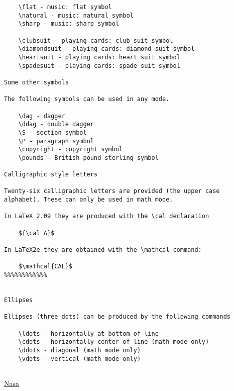 \documentclass{article}
\begin{document}
\begin{verbatim}
    \flat - music: flat symbol
    \natural - music: natural symbol
    \sharp - music: sharp symbol

    \clubsuit - playing cards: club suit symbol
    \diamondsuit - playing cards: diamond suit symbol
    \heartsuit - playing cards: heart suit symbol
    \spadesuit - playing cards: spade suit symbol

Some other symbols

The following symbols can be used in any mode.

    \dag - dagger
    \ddag - double dagger
    \S - section symbol
    \P - paragraph symbol
    \copyright - copyright symbol
    \pounds - British pound sterling symbol

Calligraphic style letters

Twenty-six calligraphic letters are provided (the upper case alphabet). These can only be used in math mode.

In LaTeX 2.09 they are produced with the \cal declaration

    ${\cal A}$

In LaTeX2e they are obtained with the \mathcal command:

    $\mathcal{CAL}$
%%%%%%%%%%%%


Ellipses

Ellipses (three dots) can be produced by the following commands

    \ldots - horizontally at bottom of line
    \cdots - horizontally center of line (math mode only)
    \ddots - diagonal (math mode only)
    \vdots - vertical (math mode only)


\end{verbatim}
\href{https://www.giss.nasa.gov/tools/latex/ltx-401.html}{Nasa}
\end{document}
